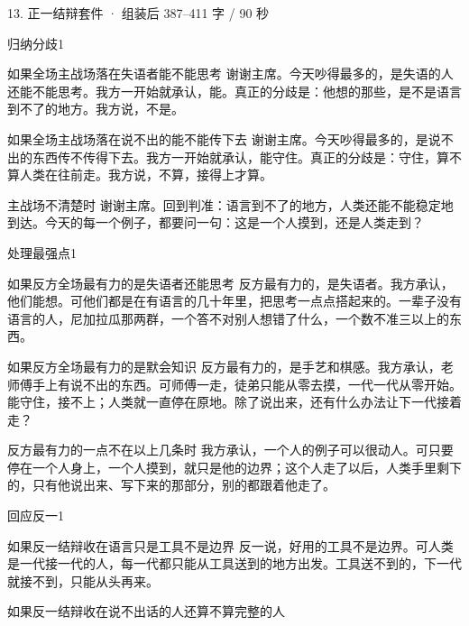 \documentclass[script,pro]{debate}
\begin{document}
\begin{kit}{13. 正一结辩}{套件 · 组装后 387–411 字 / 90 秒}
\begin{pick}{归纳分歧}{1}
\begin{module}{如果全场主战场落在失语者能不能思考}
谢谢主席。今天吵得最多的，是失语的人还能不能思考。我方一开始就承认，能。真正的分歧是：他想的那些，是不是语言到不了的地方。我方说，不是。
\end{module}
\begin{module}{如果全场主战场落在说不出的能不能传下去}
谢谢主席。今天吵得最多的，是说不出的东西传不传得下去。我方一开始就承认，能守住。真正的分歧是：守住，算不算人类在往前走。我方说，不算，接得上才算。
\end{module}
\begin{fallback}{主战场不清楚时}
谢谢主席。回到判准：语言到不了的地方，人类还能不能稳定地到达。今天的每一个例子，都要问一句：这是一个人摸到，还是人类走到？
\end{fallback}
\end{pick}
\begin{pick}{处理最强点}{1}
\begin{module}{如果反方全场最有力的是失语者还能思考}
反方最有力的，是失语者。我方承认，他们能想。可他们都是在有语言的几十年里，把思考一点点搭起来的。一辈子没有语言的人，尼加拉瓜那两群，一个答不对别人想错了什么，一个数不准三以上的东西。
\end{module}
\begin{module}{如果反方全场最有力的是默会知识}
反方最有力的，是手艺和棋感。我方承认，老师傅手上有说不出的东西。可师傅一走，徒弟只能从零去摸，一代一代从零开始。能守住，接不上；人类就一直停在原地。除了说出来，还有什么办法让下一代接着走？
\end{module}
\begin{fallback}{反方最有力的一点不在以上几条时}
我方承认，一个人的例子可以很动人。可只要停在一个人身上，一个人摸到，就只是他的边界；这个人走了以后，人类手里剩下的，只有他说出来、写下来的那部分，别的都跟着他走了。
\end{fallback}
\end{pick}
\begin{pick}{回应反一}{1}
\begin{module}{如果反一结辩收在语言只是工具不是边界}
反一说，好用的工具不是边界。可人类是一代接一代的人，每一代都只能从工具送到的地方出发。工具送不到的，下一代就接不到，只能从头再来。
\end{module}
\begin{module}{如果反一结辩收在说不出话的人还算不算完整的人}

\end{module}
\end{pick}
\end{kit}
\end{document}
